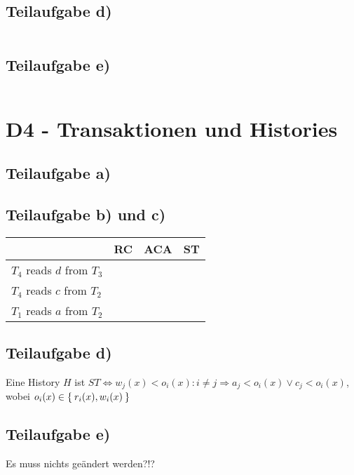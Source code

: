\documentclass[a4paper]{scrartcl}
\newcommand{\cmark}{\ding{51}}%
\begin{document}
\subsection{Teilaufgabe d)}
\inputminted[linenos, numbersep=5pt, tabsize=4]{sql}{d3d.sql}

\subsection{Teilaufgabe e)}
\inputminted[linenos, numbersep=5pt, tabsize=4]{sql}{d3e.sql}

\section{D4 - Transaktionen und Histories}
\subsection{Teilaufgabe a)}

\subsection{Teilaufgabe b) und c)}
    \begin{tabular}{l|lll}
    ~                          & RC     & ACA    & ST     \\ \hline
    $T_4$ reads $d$ from $T_3$ & \cmark & \cmark & \cmark \\
    $T_4$ reads $c$ from $T_2$ & \cmark & \cmark & \cmark \\
    $T_1$ reads $a$ from $T_2$ & \cmark & \cmark & \cmark \\
    \end{tabular}

\subsection{Teilaufgabe d)}
Eine History $H$ ist $ST \Leftrightarrow w_j(x) < o_i(x): i \neq j \Rightarrow a_j < o_i(x) \lor c_j < o_i(x)$, wobei $o_i(x) \in \Set{r_i(x), w_i(x)}$

\subsection{Teilaufgabe e)}
Es muss nichts geändert werden?!?
\end{document}
